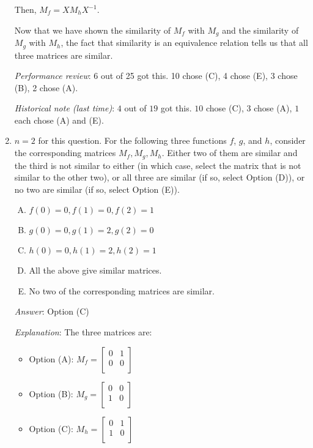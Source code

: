 \documentclass[10pt]{amsart}
\begin{document}
\begin{enumerate}
  Then, $M_f = XM_hX^{-1}$.

  Now that we have shown the similarity of $M_f$ with $M_g$ and the
  similarity of $M_g$ with $M_h$, the fact that similarity is an
  equivalence relation tells us that all three matrices are similar.

  {\em Performance review}: 6 out of 25 got this. 10 chose (C), 4
  chose (E), 3 chose (B), 2 chose (A).

  {\em Historical note (last time)}: $4$ out of $19$ got this. $10$ chose (C),
  $3$ chose (A), $1$ each chose (A) and (E).

\item $n = 2$ for this question. For the following three functions
  $f$, $g$, and $h$, consider the corresponding matrices
  $M_f,M_g,M_h$. Either two of them are similar and the third is not
  similar to either (in which case, select the matrix that is not
  similar to the other two), or all three are similar (if so, select
  Option (D)), or no two are similar (if so, select Option (E)).

  \begin{enumerate}[(A)]
  \item $f(0) = 0, f(1) = 0, f(2) = 1$
  \item $g(0) = 0, g(1) = 2, g(2) = 0$
  \item $h(0) = 0, h(1) = 2, h(2) = 1$
  \item All the above give similar matrices.
  \item No two of the corresponding matrices are similar.
  \end{enumerate}

  {\em Answer}: Option (C)

  {\em Explanation}: The three matrices are:

  \begin{itemize}
  \item Option (A): $M_f = \left[\begin{matrix} 0 & 1 \\ 0 & 0
      \\\end{matrix}\right]$
  \item Option (B): $M_g = \left[\begin{matrix} 0 & 0 \\ 1 & 0
      \\\end{matrix} \right]$
  \item Option (C): $M_h = \left[\begin{matrix} 0 & 1 \\ 1 & 0
      \\\end{matrix}\right]$
  \end{itemize}


\end{enumerate}
\end{document}
